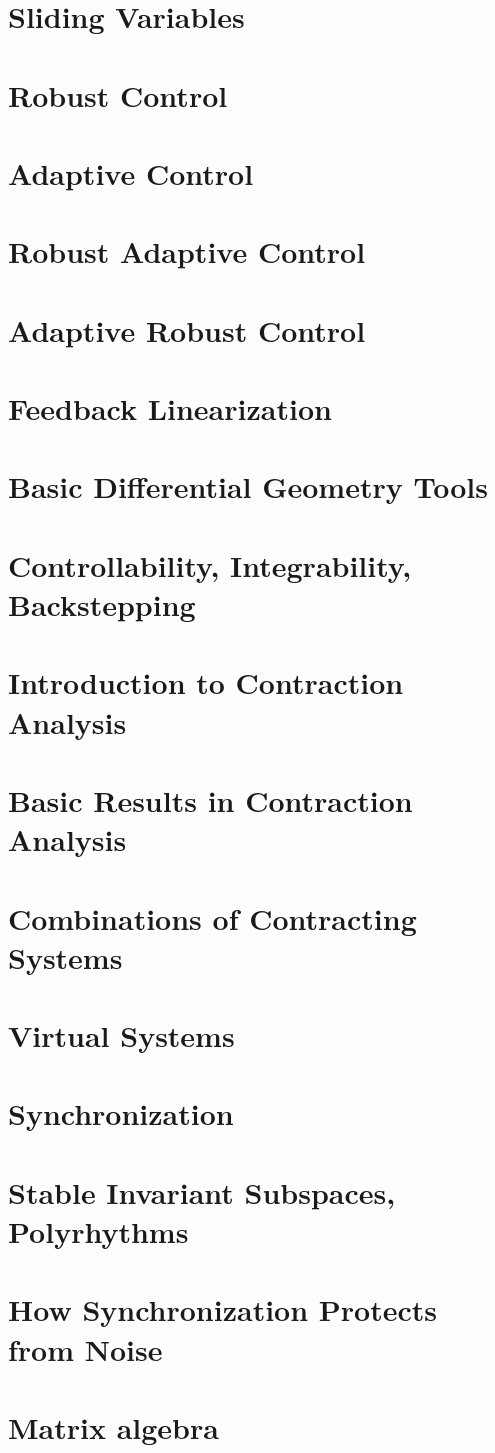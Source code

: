 \documentclass{article}
\begin{document}
\section{Sliding Variables}
\section{Robust Control}
\section{Adaptive Control}
\section{Robust Adaptive Control}
\section{Adaptive Robust Control}
\section{Feedback Linearization}
\section{Basic Differential Geometry Tools}
\section{Controllability, Integrability, Backstepping}
\section{Introduction to Contraction Analysis}
\section{Basic Results in Contraction Analysis}
\section{Combinations of Contracting Systems}
\section{Virtual Systems}
\section{Synchronization}
\section{Stable Invariant Subspaces, Polyrhythms}
\section{How Synchronization Protects from Noise}

\appendix
\section{Matrix algebra}
\end{document}
